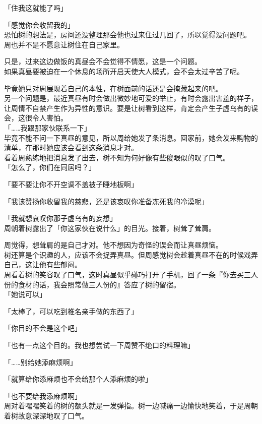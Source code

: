 「住我这就能了吗」

「感觉你会收留我的」\\

恐怕树的想法是，房间还没整理那会他也过来住过几回了，所以觉得没问题吧。\\

周也并不是不愿意让树住在自己家里。

只是，过来这边做饭的真昼会不会觉得不情愿，这是一个问题。\\

如果真昼要被迫在一个休息的场所开启天使大人模式，会不会太过辛苦了呢。

毕竟她只对周展现着自己的本性，在树面前的话还是会掩藏起来的吧。\\

另一个问题是，最近真昼有时会做出微妙地可爱的举止，有时会露出害羞的样子，让周情不自禁产生作为异性的意识。要是让树看到这样，肯定会产生子虚乌有的误会，这很令人害怕。\\

「……我跟那家伙联系一下」\\

毕竟不能不问一下真昼的意见，所以周给她发了条消息。回家前，她会发来购物的清单，在那时她应该会看到这条消息才对。\\

看着周熟练地把消息发了出去，树不知为何好像有些傻眼似的叹了口气。\\

「怎么了，你们在同居吗？」

「要不要让你不开空调不盖被子睡地板啊」

「我该赞扬你收留我的慈悲，还是该哀叹你准备冻死我的冷漠呢」

「我就想哀叹你那子虚乌有的妄想」\\

周朝着树露出了「你这家伙在说什么」的目光。接着，树耸了耸肩。

周觉得，想耸肩的是自己才对。他不想因为奇怪的误会而让真昼烦恼。\\

树还算是个识趣的人，应该不会捉弄真昼。但周感觉树会趁着真昼不在的时候戏弄自己，这让他有些郁闷。\\

周看着树的笑容叹了口气，这时真昼似乎碰巧打开了手机，回了一条『你去买三人份的食材的话，我会照常做三人份的』答应了树的留宿。\\

「她说可以」

「太棒了，可以吃到椎名亲手做的东西了」

「你目的不会是这个吧」

「也有一点这个目的。我也想尝试一下周赞不绝口的料理嘛」

「……别给她添麻烦啊」

「就算给你添麻烦也不会给那个人添麻烦的啦」

「也不要给我添麻烦啊」\\

周对着嘿嘿笑着的树的额头就是一发弹指。树一边喊痛一边愉快地笑着，于是周朝着树故意深深地叹了口气。
